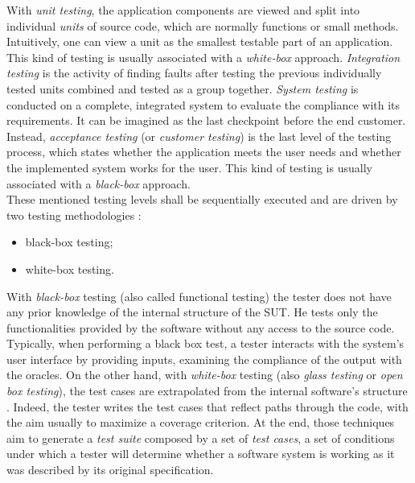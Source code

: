 With \textit{unit testing}, the application components are viewed and split into  individual \textit{units} of source code, which are normally functions or small methods. Intuitively, one can view a unit as the smallest testable part of an application. This kind of testing is usually associated with a \textit{white-box} approach. \textit{Integration testing} is the activity of finding faults after testing the previous individually tested units combined and tested as a group together. \textit{System testing} is conducted on a complete, integrated system to evaluate the compliance with its requirements. It can be imagined as the last checkpoint before the end customer. Instead, \textit{acceptance testing} (or \textit{customer testing}) is the last level of the testing process, which states whether the application meets the user needs and whether the implemented system works for the user. This kind of testing is usually associated with a \textit{black-box} approach. 
\\
These mentioned testing levels shall be sequentially executed and are driven by two testing methodologies \cite{white-box, black-box}: 
\begin{itemize}
\item black-box testing;
\item white-box testing.
\end{itemize} 
With \textit{black-box} testing (also called functional testing) the tester does not have any prior knowledge of the internal structure of the SUT. He tests only the functionalities provided by the software without any access to the source code. Typically, when performing a black box test, a tester interacts with the system's user interface by providing inputs, examining the compliance of the output with the oracles. 
On the other hand, with \textit{white-box} testing (also \textit{glass testing} or \textit{open box testing}), the test cases are extrapolated from the internal software's structure \cite{grano}. Indeed, the tester writes the test cases that reflect paths through the code, with the aim usually to maximize a coverage criterion. 
At the end, those techniques aim to generate a \textit{test suite} composed by a set of \textit{test cases}, \ie a set of conditions under which a tester will determine whether a software system is working as it was described by its original specification.

